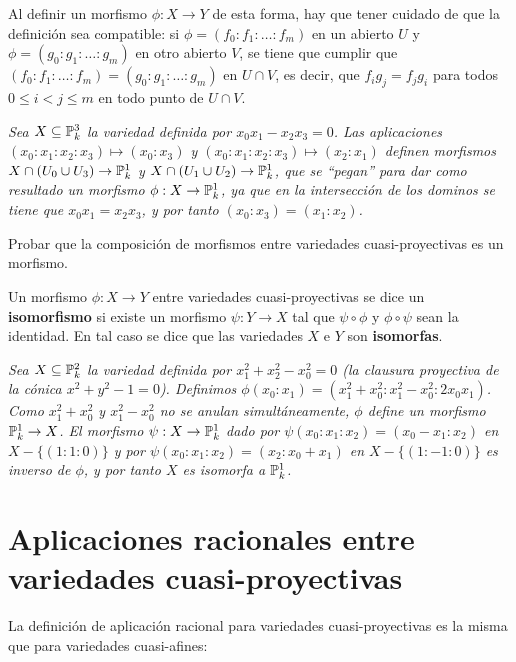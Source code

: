 \documentclass[ACGA.tex]{subfiles}
\begin{document}
Al definir un morfismo $\phi:X\to Y$ de esta forma, hay que tener cuidado de que la definición sea compatible: si $\phi=(f_0:f_1:\ldots:f_m)$ en un abierto $U$ y $\phi=(g_0:g_1:\ldots:g_m)$ en otro abierto $V$, se tiene que cumplir que $(f_0:f_1:\ldots:f_m)=(g_0:g_1:\ldots:g_m)$ en $U\cap V$, es decir, que $f_ig_j=f_jg_i$ para todos $0\leq i<j\leq m$ en todo punto de $U\cap V$. 

\begin{ejs}
 \emph{Sea $X\subseteq\mathbb{P}^3_k$ la variedad definida por $x_0x_1-x_2x_3=0$. Las aplicaciones $(x_0:x_1:x_2:x_3)\mapsto (x_0:x_3)$ y $(x_0:x_1:x_2:x_3)\mapsto (x_2:x_1)$ definen morfismos $X\cap (U_0\cup U_3)\to\mathbb{P}^1_k$ y $X\cap (U_1\cup U_2)\to\mathbb{P}^1_k$, que se ``pegan'' para dar como resultado un morfismo $\phi:X\to\mathbb{P}^1_k$, ya que en la intersección de los dominos se tiene que $x_0x_1=x_2x_3$, y por tanto $(x_0:x_3)=(x_1:x_2)$.
}
\end{ejs}

\begin{ejer}
 Probar que la composición de morfismos entre variedades cuasi-proyectivas es un morfismo.
\end{ejer}


\begin{defi}
 Un morfismo $\phi:X\to Y$ entre variedades cuasi-proyectivas se dice un {\bf isomorfismo} si existe un morfismo $\psi:Y\to X$ tal que $\psi\circ\phi$ y $\phi\circ\psi$ sean la identidad. En tal caso se dice que las variedades $X$ e $Y$ son {\bf isomorfas}.
\end{defi}

\begin{ejs}
 \emph{Sea $X\subseteq\mathbb{P}^2_k$ la variedad definida por $x_1^2+x_2^2-x_0^2=0$ (la clausura proyectiva de la cónica $x^2+y^2-1=0$). Definimos $\phi(x_0:x_1)=(x_1^2+x_0^2:x_1^2-x_0^2:2x_0x_1)$. Como $x_1^2+x_0^2$ y $x_1^2-x_0^2$ no se anulan simultáneamente, $\phi$ define un morfismo $\mathbb{P}^1_k\to X$. El morfismo $\psi:X\to\mathbb{P}^1_k$ dado por $\psi(x_0:x_1:x_2)=(x_0-x_1:x_2)$ en $X-\{(1:1:0)\}$ y por $\psi(x_0:x_1:x_2)=(x_2:x_0+x_1)$ en $X-\{(1:-1:0)\}$ es inverso de $\phi$, y por tanto $X$ es isomorfa a $\mathbb{P}^1_k$.}
\end{ejs}

\section{Aplicaciones racionales entre variedades cuasi-proyectivas}

La definición de aplicación racional para variedades cuasi-proyectivas es la misma que para variedades cuasi-afines:
\end{document}
